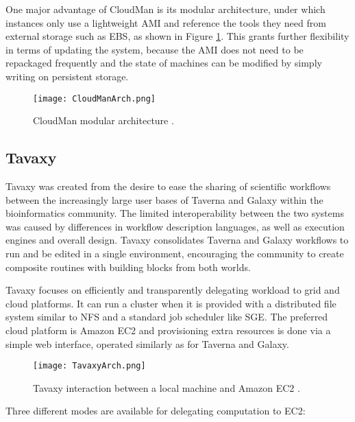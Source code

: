 One major advantage of CloudMan is its modular architecture, under which instances only use a lightweight AMI and reference the tools they need from external storage such as EBS, as shown in Figure \ref{CloudManArch}. This grants further flexibility in terms of updating the system, because the AMI does not need to be repackaged frequently and the state of machines can be modified by simply writing on persistent storage.

\begin{figure}[h]
	\centering
		\texttt{[image: CloudManArch.png]}
	\caption{CloudMan modular architecture \cite{Afgan2010}.}
	\label{CloudManArch}
\end{figure}

\subsection{Tavaxy}

Tavaxy \cite{Abouelhoda2012} was created from the desire to ease the sharing of scientific workflows between the increasingly large user bases of Taverna and Galaxy within the bioinformatics community. The limited interoperability between the two systems was caused by differences in workflow description languages, as well as execution engines and overall design. Tavaxy consolidates Taverna and Galaxy workflows to run and be edited in a single environment, encouraging the community to create composite routines with building blocks from both worlds.

Tavaxy focuses on efficiently and transparently delegating workload to grid and cloud platforms. It can run a cluster when it is provided with a distributed file system similar to NFS and a standard job scheduler like SGE. The preferred cloud platform is Amazon EC2 and provisioning extra resources is done via a simple web interface, operated similarly as for Taverna and Galaxy.

\begin{figure}[h]
	\centering
		\texttt{[image: TavaxyArch.png]}
	\caption{Tavaxy interaction between a local machine and Amazon EC2 \cite{Abouelhoda2012}.}
	\label{TavaxyArch}
\end{figure}

Three different modes are available for delegating computation to EC2:


